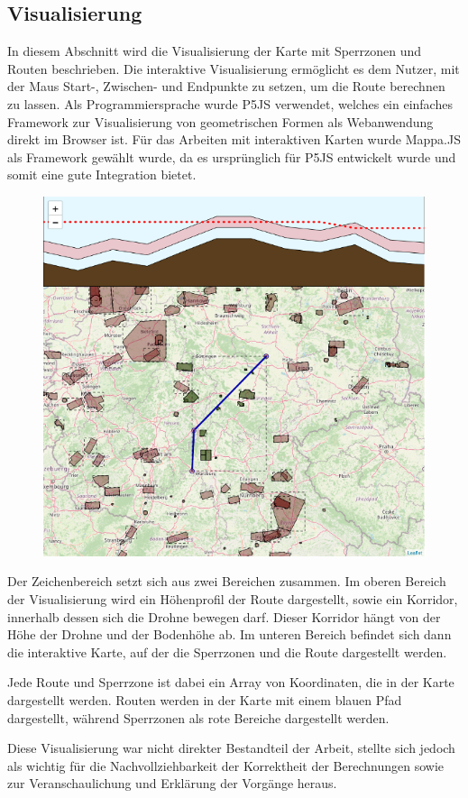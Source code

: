 \subsection*{Visualisierung}



In diesem Abschnitt wird die Visualisierung der Karte mit Sperrzonen und Routen beschrieben. Die interaktive Visualisierung ermöglicht es dem Nutzer, mit der Maus Start-, Zwischen- und Endpunkte zu setzen, um die Route berechnen zu lassen. Als Programmiersprache wurde P5JS verwendet, welches ein einfaches Framework zur Visualisierung von geometrischen Formen als Webanwendung direkt im Browser ist. Für das Arbeiten mit interaktiven Karten wurde Mappa.JS \cite{MappaJsCanvas} als Framework gewählt wurde, da es ursprünglich für P5JS \cite{HomeP5Js} entwickelt wurde und somit eine gute Integration bietet.

\begin{figure}[h]
    \includegraphics[width=\columnwidth]{images/final-map-with-routing-and-height-profile}
\end{figure}

Der Zeichenbereich setzt sich aus zwei Bereichen zusammen.
Im oberen Bereich der Visualisierung wird ein Höhenprofil der Route dargestellt, sowie ein Korridor, innerhalb dessen sich die Drohne bewegen darf. Dieser Korridor hängt von der Höhe der Drohne und der Bodenhöhe ab.
Im unteren Bereich befindet sich dann die interaktive Karte, auf der die Sperrzonen und die Route dargestellt werden.

Jede Route und Sperrzone ist dabei ein Array von Koordinaten, die in der Karte dargestellt werden. Routen werden in der Karte mit einem blauen Pfad dargestellt, während Sperrzonen als rote Bereiche dargestellt werden.

Diese Visualisierung war nicht direkter Bestandteil der Arbeit,  stellte sich jedoch als wichtig für die Nachvollziehbarkeit der Korrektheit der Berechnungen sowie zur Veranschaulichung und Erklärung der Vorgänge heraus.